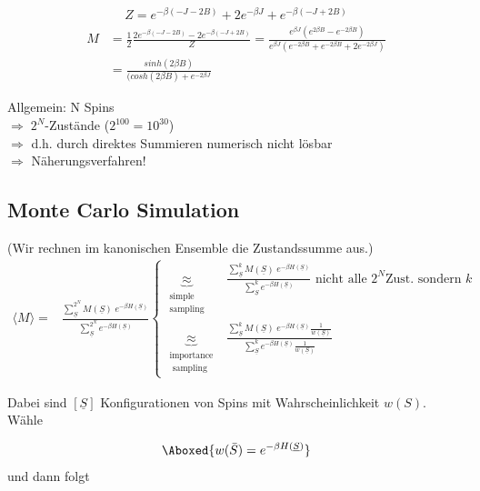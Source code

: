 \documentclass[12pt]{article}
\begin{document}
\begin{align*}
Z= e^{-\beta (-J -2B)} + 2 e^{-\beta J} + e^{- \beta (-J +2B)}
\end{align*}
\begin{align*}
 M &= \frac{1}{2} \frac{2 e^{-\beta (-J - 2B)} - 2 e^{-\beta (-J + 2B)}}{Z} = \frac{e^{\beta J} \left( e^{2 \beta B} - e^{-2\beta B} \right)}{e^{\beta J} \left( e^{-2\beta B} + e^{-2 \beta B} + 2 e^{-2 \beta J} \right)} \\
 &= \frac{sinh( 2 \beta B) }{(cosh(2 \beta B) + e^{-2 \beta J}}
\end{align*}
 
Allgemein: N Spins \\
$\Rightarrow \; 2^N$-Zustände ($2^{100} = 10^{30}$) \\
$\Rightarrow$ d.h. durch direktes Summieren numerisch nicht lösbar \\
$\Rightarrow$ Näherungsverfahren!

\subsection{Monte Carlo Simulation}
(Wir rechnen im kanonischen Ensemble die Zustandssumme aus.)
\begin{align}
\langle M \rangle = & \frac{\sum^{2^N}_{\underline{S}} M(\underline{S}) \;  e^{-\beta H(\underline{S} ) }}{\sum^{2^N}_{\underline{S}} e^{-\beta H(\underline{S})}}  
\begin{cases}
 \underbrace{\approx}_{\substack{ \text{simple} \\ \text{sampling}}} 
& \frac{\sum^{k}_{\underline{S}} M(\underline{S}) \; e^{-\beta H(\underline{S})}}{\sum^{k}_{\underline{S}} e^{-\beta H(\underline{S})}} \mbox{ nicht alle } 2^N \mbox{Zust. sondern } k \\
\underbrace{\approx}_{\substack{ \text{importance} \\ \text{ sampling}}} & 
\frac{\sum^{k}_{\underline{S}} M(\underline{S}) \; e^{-\beta H(\underline{S})} \frac{1}{w(\underline{S})}}{\sum^{k}_{\underline{S}} e^{-\beta H(\underline{S})} \frac{1}{w(\underline{S})}}
\end{cases}
\end{align}

Dabei sind $[\underline{S}]$ Konfigurationen von Spins mit Wahrscheinlichkeit $w(S)$. Wähle 

\begin{align}
\Aboxed{ w(\bar{S})= e^{-\beta H(\underline{S})}  }
\end{align}
 und dann folgt
\end{document}
